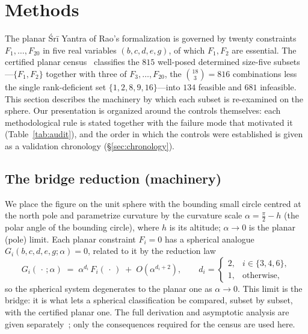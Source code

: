 \documentclass[11pt]{article}
\begin{document}
\section{Methods}
\label{sec:methods}

The planar Śrī Yantra of Rao's formalization is governed by twenty constraints $F_1,\dots,F_{20}$ in five real variables $(b,c,d,e,g)$, of which $F_1,F_2$ are essential. The certified planar census~\cite{plane-census} classifies the $815$ well-posed determined size-five subsets---$\{F_1,F_2\}$ together with three of $F_3,\dots,F_{20}$, the $\binom{18}{3}=816$ combinations less the single rank-deficient set $\{1,2,8,9,16\}$---into $134$ feasible and $681$ infeasible. This section describes the machinery by which each subset is re-examined on the sphere. Our presentation is organized around the controls themselves: each methodological rule is stated together with the failure mode that motivated it (Table~\ref{tab:audit}), and the order in which the controls were established is given as a validation chronology (\S\ref{sec:chronology}).

\subsection{The bridge reduction (machinery)}
\label{sec:bridge}

We place the figure on the unit sphere with the bounding small circle centred at the north pole and parametrize curvature by the curvature scale
$\alpha = \tfrac{\pi}{2}-h$ (the polar angle of the bounding circle), where $h$ is its altitude; $\alpha\to 0$ is the planar (pole) limit. Each planar constraint $F_i=0$ has a spherical analogue $G_i(b,c,d,e,g;\alpha)=0$, related to it by the reduction law
\begin{equation}
G_i(\,\cdot\,;\alpha) \;=\; \alpha^{d_i}\,F_i(\,\cdot\,) \;+\; O\!\left(\alpha^{d_i+2}\right),
\qquad
d_i =
\begin{cases}
2, & i\in\{3,4,6\},\\
1, & \text{otherwise,}
\end{cases}
\label{eq:reduction}
\end{equation}
so the spherical system degenerates to the planar one as $\alpha\to 0$. This
limit is the bridge: it is what lets a spherical classification be compared,
subset by subset, with the certified planar one. The full derivation and
asymptotic analysis are given separately~\cite{bridge}; only the consequences
required for the census are used here.
\end{document}
